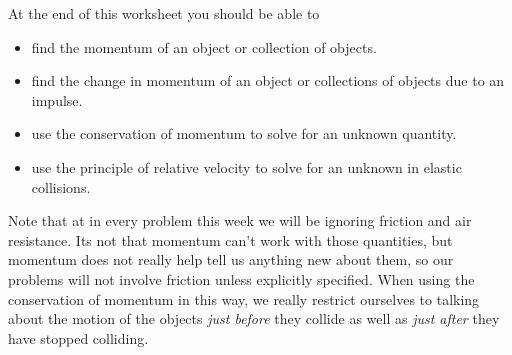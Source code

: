 At the end of this worksheet you should be able to  
\begin{itemize}
	\item find the momentum of an object or collection of objects.
	\item find the change in momentum of an object or collections of objects due to an impulse.
	\item use the conservation of momentum to solve for an unknown quantity.
	\item use the principle of relative velocity to solve for an unknown in elastic collisions.
\end{itemize}

Note that at in every problem this week we will be ignoring friction and air resistance. Its not that momentum can't work with those quantities, but momentum does not really help tell us anything new about them, so our problems will not involve friction unless explicitly specified. When using the conservation of momentum in this way, we really restrict ourselves to talking about the motion of the objects \emph{just before} they collide as well as \emph{just after} they have stopped colliding.

